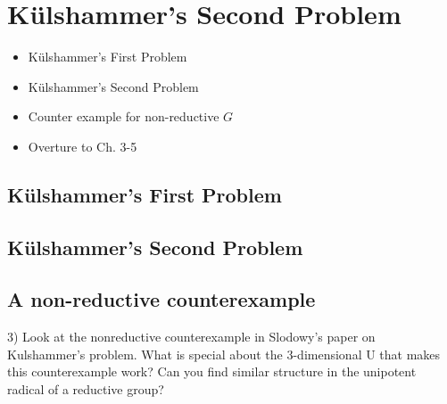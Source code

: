 
\chapter{K\"ulshammer's Second Problem}
\label{Chapter3}

\begin{itemize}
\item K\"ulshammer's First Problem
\item K\"ulshammer's Second Problem
\item Counter example for non-reductive $G$
\item Overture to Ch. 3-5
\end{itemize}

\section{K\"ulshammer's First Problem}

\section{K\"ulshammer's Second Problem}

\section{A non-reductive counterexample}
3) Look at the nonreductive counterexample in Slodowy's paper on Kulshammer's problem.  What is special about the 3-dimensional U that makes this counterexample work?  Can you find similar structure in the unipotent radical of a reductive group?